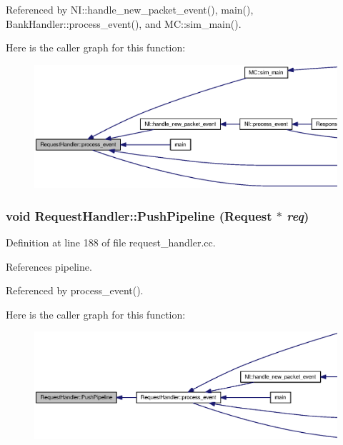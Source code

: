 Referenced by NI::handle\_\-new\_\-packet\_\-event(), main(), BankHandler::process\_\-event(), and MC::sim\_\-main().

Here is the caller graph for this function:\nopagebreak
\begin{figure}[H]
\begin{center}
\leavevmode
\includegraphics[width=420pt]{classRequestHandler_c295b7e01ed866b390c93a559f375b2f_icgraph}
\end{center}
\end{figure}
\subsubsection[{PushPipeline}]{\setlength{\rightskip}{0pt plus 5cm}void RequestHandler::PushPipeline ({\bf Request} $\ast$ {\em req})}\label{classRequestHandler_a3cfb7f3392498247527d307e49d4418}




Definition at line 188 of file request\_\-handler.cc.

References pipeline.

Referenced by process\_\-event().

Here is the caller graph for this function:\nopagebreak
\begin{figure}[H]
\begin{center}
\leavevmode
\includegraphics[width=420pt]{classRequestHandler_a3cfb7f3392498247527d307e49d4418_icgraph}
\end{center}
\end{figure}
